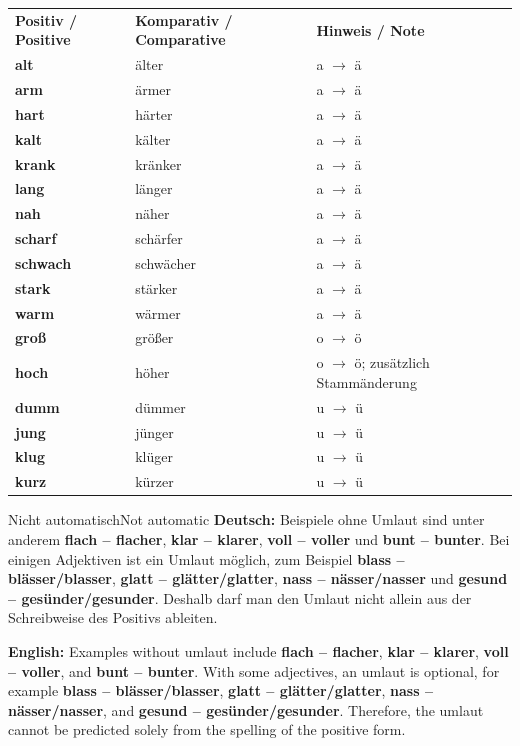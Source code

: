 \documentclass[a4paper,11pt]{article}
\newcommand{\GermanText}[1]{\textbf{Deutsch: }#1\par}
\newcommand{\EnglishText}[1]{{\small\color{SoftGray}\textbf{English: }#1\par}}
\begin{document}
\begin{longtable}{>{\bfseries}p{3.3cm}|p{3.5cm}|p{6.5cm}}
\rowcolor{HeaderBlueDark}
\color{white}\textbf{Positiv / Positive} &
\color{white}\textbf{Komparativ / Comparative} &
\color{white}\textbf{Hinweis / Note} \\
alt & älter & a $\rightarrow$ ä \\
arm & ärmer & a $\rightarrow$ ä \\
hart & härter & a $\rightarrow$ ä \\
kalt & kälter & a $\rightarrow$ ä \\
krank & kränker & a $\rightarrow$ ä \\
lang & länger & a $\rightarrow$ ä \\
nah & näher & a $\rightarrow$ ä \\
scharf & schärfer & a $\rightarrow$ ä \\
schwach & schwächer & a $\rightarrow$ ä \\
stark & stärker & a $\rightarrow$ ä \\
warm & wärmer & a $\rightarrow$ ä \\
groß & größer & o $\rightarrow$ ö \\
hoch & höher & o $\rightarrow$ ö; zusätzlich Stammänderung \\
dumm & dümmer & u $\rightarrow$ ü \\
jung & jünger & u $\rightarrow$ ü \\
klug & klüger & u $\rightarrow$ ü \\
kurz & kürzer & u $\rightarrow$ ü \\
\end{longtable}

\begin{grammarentry}{Nicht automatisch}{Not automatic}
\GermanText{Beispiele ohne Umlaut sind unter anderem \textbf{flach -- flacher}, \textbf{klar -- klarer}, \textbf{voll -- voller} und \textbf{bunt -- bunter}. Bei einigen Adjektiven ist ein Umlaut möglich, zum Beispiel \textbf{blass -- blässer/blasser}, \textbf{glatt -- glätter/glatter}, \textbf{nass -- nässer/nasser} und \textbf{gesund -- gesünder/gesunder}. Deshalb darf man den Umlaut nicht allein aus der Schreibweise des Positivs ableiten.}
\EnglishText{Examples without umlaut include \textbf{flach -- flacher}, \textbf{klar -- klarer}, \textbf{voll -- voller}, and \textbf{bunt -- bunter}. With some adjectives, an umlaut is optional, for example \textbf{blass -- blässer/blasser}, \textbf{glatt -- glätter/glatter}, \textbf{nass -- nässer/nasser}, and \textbf{gesund -- gesünder/gesunder}. Therefore, the umlaut cannot be predicted solely from the spelling of the positive form.}
\end{grammarentry}
\end{document}

